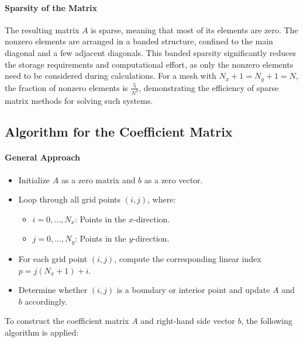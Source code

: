 \documentclass{article}
\begin{document}
			\paragraph{Sparsity of the Matrix}
			 The resulting matrix \( A \) is sparse, meaning that most of its elements are zero. The nonzero elements are arranged in a banded structure, confined to the main diagonal and a few adjacent diagonals. This banded sparsity significantly reduces the storage requirements and computational effort, as only the nonzero elements need to be considered during calculations.
			 For a mesh with \( N_x + 1 = N_y + 1 = N \), the fraction of nonzero elements is \( \frac{5}{N^2} \), demonstrating the efficiency of sparse matrix methods for solving such systems.
		
		\subsection{Algorithm for the Coefficient Matrix}
		
			
			
			\paragraph{General Approach}
			\begin{itemize}
				\item Initialize \( A \) as a zero matrix and \( b \) as a zero vector.
				\item Loop through all grid points \((i, j)\), where:
				\begin{itemize}
					\item \( i = 0, \ldots, N_x \): Points in the \( x \)-direction.
					\item \( j = 0, \ldots, N_y \): Points in the \( y \)-direction.
				\end{itemize}
				\item For each grid point \((i, j)\), compute the corresponding linear index \( p = j(N_x + 1) + i \).
				\item Determine whether \((i, j)\) is a boundary or interior point and update \( A \) and \( b \) accordingly.
			\end{itemize}
			To construct the coefficient matrix \( A \) and right-hand side vector \( b \), the following algorithm is applied:
			
\end{document}
